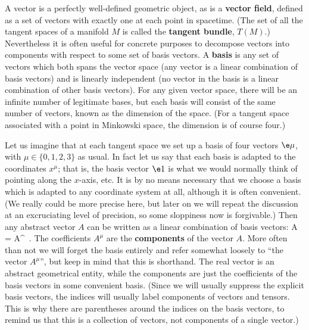 A vector is a perfectly well-defined geometric object, as is a {\bf vector
field}, defined as a set of vectors with exactly one at each point in 
spacetime.  (The set of all the tangent spaces of a manifold $M$ is 
called the {\bf tangent bundle}, $T(M)$.)
Nevertheless it is often useful for concrete purposes to
decompose vectors into components with respect to some set of basis
vectors.  A {\bf basis} is any set of vectors which both spans the
vector space (any vector is a linear combination of basis vectors) and
is linearly independent (no vector in the basis is a linear combination of
other basis vectors).  For any given vector space, there will be an 
infinite number of legitimate bases, but each basis will consist of the
same number of vectors, known as the dimension of the space.  (For
a tangent space associated with a point in Minkowski space, the dimension
is of course four.)

Let us imagine that at each tangent space we set up a basis of four
vectors $\e\mu$, with $\mu\in\{0,1,2,3\}$ as usual.  In fact let us
say that each basis is adapted to the coordinates $x^\mu$; that is, the
basis vector $\e1$ is what we would normally think of pointing along
the $x$-axis, etc.  It is by no means necessary that we choose a basis
which is adapted to any coordinate system at all, although it is often
convenient.  (We really could be more precise here, but later
on we will repeat the discussion at an excruciating level of precision,
so some sloppiness now is forgivable.)  Then any abstract vector
$A$ can be written as a linear combination of basis vectors:
\be
  A = A^\mu \e\mu\ .\label{1.23}
\ee
The coefficients $A^\mu$ are the {\bf components} of the vector $A$.
More often than not we will forget the basis entirely and refer somewhat
loosely to ``the vector $A^\mu$'', but keep in mind that this is 
shorthand.  The real vector is an abstract geometrical entity, while the
components are just the coefficients of the basis vectors in some 
convenient basis.  (Since we will usually suppress the explicit basis
vectors, the indices will usually label components of vectors and 
tensors.  This is why there are parentheses around the indices on the
basis vectors, to remind us that this is a collection of vectors, not
components of a single vector.)

